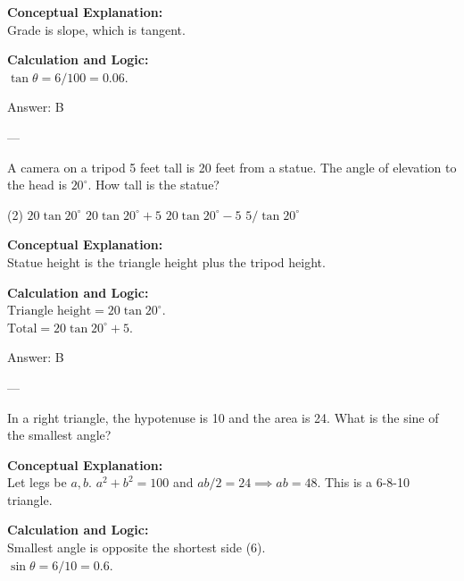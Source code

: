 \documentclass[11pt,paper=a4,answers]{exam}
\begin{document}
\begin{questions}
\begin{solution}
\textbf{Conceptual Explanation:} \\
Grade is slope, which is tangent.

\vspace{10pt}
\textbf{Calculation and Logic:} \\
$\tan \theta = 6/100 = 0.06$.

\vspace{15pt}
Answer: \colorbox{yellow!100}{B}
\end{solution}

---

\question
A camera on a tripod 5 feet tall is 20 feet from a statue. The angle of elevation to the head is $20^\circ$. How tall is the statue?
\begin{tasks}(2)
    \task $20 \tan 20^\circ$
    \task $20 \tan 20^\circ + 5$
    \task $20 \tan 20^\circ - 5$
    \task $5 / \tan 20^\circ$
\end{tasks}

\begin{solution}
\textbf{Conceptual Explanation:} \\
Statue height is the triangle height plus the tripod height.

\vspace{10pt}
\textbf{Calculation and Logic:} \\
$\text{Triangle height} = 20 \tan 20^\circ$. \\
$\text{Total} = 20 \tan 20^\circ + 5$.

\vspace{15pt}
Answer: \colorbox{yellow!100}{B}
\end{solution}

---

\question
In a right triangle, the hypotenuse is 10 and the area is 24. What is the sine of the smallest angle?

\begin{solution}
\textbf{Conceptual Explanation:} \\
Let legs be $a, b$. $a^2 + b^2 = 100$ and $ab/2 = 24 \implies ab = 48$. This is a 6-8-10 triangle.

\vspace{10pt}
\textbf{Calculation and Logic:} \\
Smallest angle is opposite the shortest side (6). \\
$\sin \theta = 6/10 = 0.6$.


\end{solution}
\end{questions}
\end{document}

